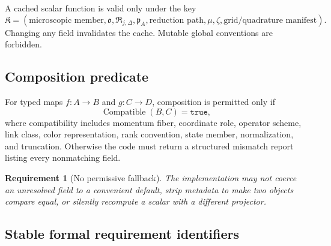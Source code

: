 \documentclass[11pt]{article}
\newtheorem{requirement}[definition]{Requirement}
\begin{document}
A cached scalar function is valid only under the key
\begin{equation}
 \mathfrak K=
 (\text{microscopic member},\mathfrak o,\mathfrak R_{j,\Delta},
 \mathfrak p_A,\text{reduction path},\mu,\zeta,
 \text{grid/quadrature manifest}).
\label{eq:gtmd-cache-key}
\end{equation}
Changing any field invalidates the cache.  Mutable global conventions are
forbidden.

\subsection{Composition predicate}

For typed maps \(f:A\to B\) and \(g:C\to D\), composition is permitted only
if
\begin{equation}
 \operatorname{Compatible}(B,C)
 =\texttt{true},
\label{eq:composition-predicate}
\end{equation}
where compatibility includes momentum fiber, coordinate role, operator
scheme, link class, color representation, rank convention, state member,
normalization, and truncation.  Otherwise the code must return a structured
mismatch report listing every nonmatching field.

\begin{requirement}[No permissive fallback]
\label{req:no-permissive-fallback}
The implementation may not coerce an unresolved field to a convenient
default, strip metadata to make two objects compare equal, or silently
recompute a scalar with a different projector.
\end{requirement}

\subsection{Stable formal requirement identifiers}
\end{document}
